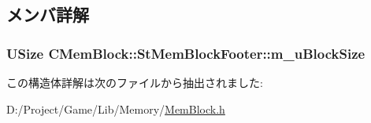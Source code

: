 \subsection{メンバ詳解}
\hypertarget{struct_c_mem_block_1_1_st_mem_block_footer_a7179368e394992595e25c768ee9fb614}{}
\subsubsection[{m\+\_\+u\+Block\+Size}]{\setlength{\rightskip}{0pt plus 5cm}U\+Size C\+Mem\+Block\+::\+St\+Mem\+Block\+Footer\+::m\+\_\+u\+Block\+Size}\label{struct_c_mem_block_1_1_st_mem_block_footer_a7179368e394992595e25c768ee9fb614}


この構造体詳解は次のファイルから抽出されました\+:\begin{DoxyCompactItemize}
\item 
D\+:/\+Project/\+Game/\+Lib/\+Memory/\hyperlink{_mem_block_8h}{Mem\+Block.\+h}\end{DoxyCompactItemize}
